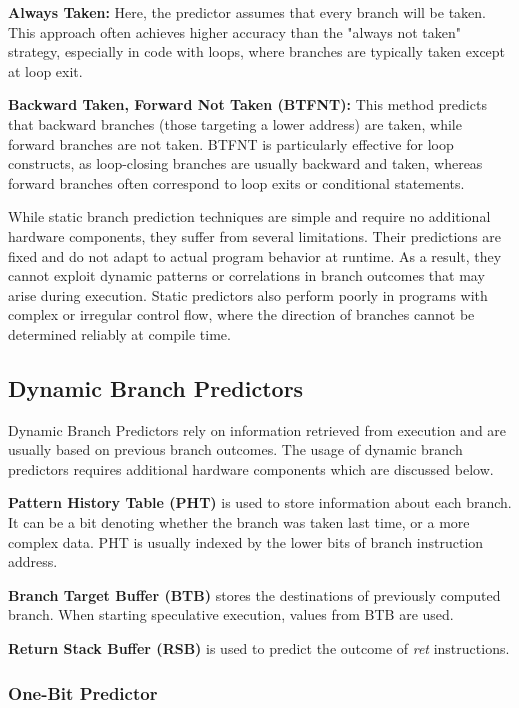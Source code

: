 \textbf{Always Taken:} Here, the predictor assumes that every branch will be taken. This approach often achieves higher accuracy than the "always not taken" strategy, especially in code with loops, where branches are typically taken except at loop exit.

\textbf{Backward Taken, Forward Not Taken (BTFNT):} This method predicts that backward branches (those targeting a lower address) are taken, while forward branches are not taken. BTFNT is particularly effective for loop constructs, as loop-closing branches are usually backward and taken, whereas forward branches often correspond to loop exits or conditional statements.

While static branch prediction techniques are simple and require no additional hardware components, they suffer from several limitations. Their predictions are fixed and do not adapt to actual program behavior at runtime. As a result, they cannot exploit dynamic patterns or correlations in branch outcomes that may arise during execution. Static predictors also perform poorly in programs with complex or irregular control flow, where the direction of branches cannot be determined reliably at compile time. 

\subsection{Dynamic Branch Predictors}

Dynamic Branch Predictors rely on information retrieved from execution and are usually based on previous branch outcomes. The usage of dynamic branch predictors requires additional hardware components which are discussed below.

\textbf{Pattern History Table (PHT)} is used to store information about each branch. It can be a bit denoting whether the branch was taken last time, or a more complex data. PHT is usually indexed by the lower bits of branch instruction address.

\textbf{Branch Target Buffer (BTB)} stores the destinations of previously computed branch. When starting speculative execution, values from BTB are used.

\textbf{Return Stack Buffer (RSB)} is used to predict the outcome of \textit{ret} instructions.

\subsubsection{One-Bit Predictor}


